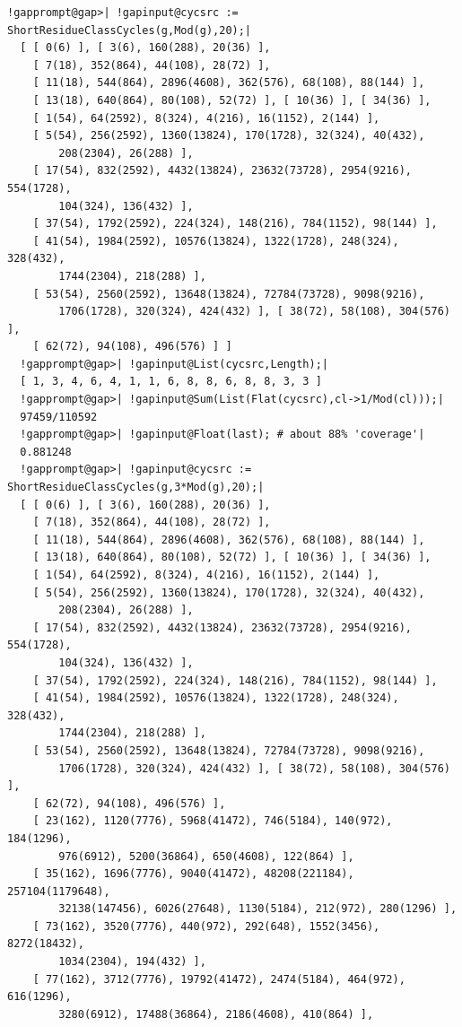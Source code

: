 \documentclass[a4paper,11pt]{report}
\begin{document}
{{\begin{Verbatim}[commandchars=!@|,fontsize=\small,frame=single,label=Example]
  !gapprompt@gap>| !gapinput@cycsrc := ShortResidueClassCycles(g,Mod(g),20);|
  [ [ 0(6) ], [ 3(6), 160(288), 20(36) ], 
    [ 7(18), 352(864), 44(108), 28(72) ], 
    [ 11(18), 544(864), 2896(4608), 362(576), 68(108), 88(144) ], 
    [ 13(18), 640(864), 80(108), 52(72) ], [ 10(36) ], [ 34(36) ], 
    [ 1(54), 64(2592), 8(324), 4(216), 16(1152), 2(144) ], 
    [ 5(54), 256(2592), 1360(13824), 170(1728), 32(324), 40(432), 
        208(2304), 26(288) ], 
    [ 17(54), 832(2592), 4432(13824), 23632(73728), 2954(9216), 554(1728), 
        104(324), 136(432) ], 
    [ 37(54), 1792(2592), 224(324), 148(216), 784(1152), 98(144) ], 
    [ 41(54), 1984(2592), 10576(13824), 1322(1728), 248(324), 328(432), 
        1744(2304), 218(288) ], 
    [ 53(54), 2560(2592), 13648(13824), 72784(73728), 9098(9216), 
        1706(1728), 320(324), 424(432) ], [ 38(72), 58(108), 304(576) ], 
    [ 62(72), 94(108), 496(576) ] ]
  !gapprompt@gap>| !gapinput@List(cycsrc,Length);|
  [ 1, 3, 4, 6, 4, 1, 1, 6, 8, 8, 6, 8, 8, 3, 3 ]
  !gapprompt@gap>| !gapinput@Sum(List(Flat(cycsrc),cl->1/Mod(cl)));|
  97459/110592
  !gapprompt@gap>| !gapinput@Float(last); # about 88% 'coverage'|
  0.881248
  !gapprompt@gap>| !gapinput@cycsrc := ShortResidueClassCycles(g,3*Mod(g),20);|
  [ [ 0(6) ], [ 3(6), 160(288), 20(36) ], 
    [ 7(18), 352(864), 44(108), 28(72) ], 
    [ 11(18), 544(864), 2896(4608), 362(576), 68(108), 88(144) ], 
    [ 13(18), 640(864), 80(108), 52(72) ], [ 10(36) ], [ 34(36) ], 
    [ 1(54), 64(2592), 8(324), 4(216), 16(1152), 2(144) ], 
    [ 5(54), 256(2592), 1360(13824), 170(1728), 32(324), 40(432), 
        208(2304), 26(288) ], 
    [ 17(54), 832(2592), 4432(13824), 23632(73728), 2954(9216), 554(1728), 
        104(324), 136(432) ], 
    [ 37(54), 1792(2592), 224(324), 148(216), 784(1152), 98(144) ], 
    [ 41(54), 1984(2592), 10576(13824), 1322(1728), 248(324), 328(432), 
        1744(2304), 218(288) ], 
    [ 53(54), 2560(2592), 13648(13824), 72784(73728), 9098(9216), 
        1706(1728), 320(324), 424(432) ], [ 38(72), 58(108), 304(576) ], 
    [ 62(72), 94(108), 496(576) ], 
    [ 23(162), 1120(7776), 5968(41472), 746(5184), 140(972), 184(1296), 
        976(6912), 5200(36864), 650(4608), 122(864) ], 
    [ 35(162), 1696(7776), 9040(41472), 48208(221184), 257104(1179648), 
        32138(147456), 6026(27648), 1130(5184), 212(972), 280(1296) ], 
    [ 73(162), 3520(7776), 440(972), 292(648), 1552(3456), 8272(18432), 
        1034(2304), 194(432) ], 
    [ 77(162), 3712(7776), 19792(41472), 2474(5184), 464(972), 616(1296), 
        3280(6912), 17488(36864), 2186(4608), 410(864) ], 

\end{Verbatim}}}
\end{document}

